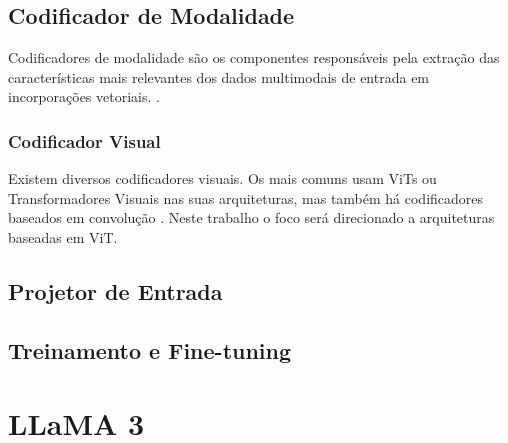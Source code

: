 \subsection{Codificador de Modalidade}

Codificadores de modalidade são os componentes responsáveis pela extração das características mais relevantes dos dados multimodais de entrada em incorporações vetoriais.
\cite{mllm_survey_2024}.

\subsubsection{Codificador Visual}

Existem diversos codificadores visuais. Os mais comuns usam \acp{ViT} ou Transformadores Visuais nas suas arquiteturas, mas também há codificadores baseados em convolução
\cite{mllm_survey_2023}. Neste trabalho o foco será direcionado a arquiteturas baseadas em \ac{ViT}.


\subsection{Projetor de Entrada}

\subsection{Treinamento e Fine-tuning}

\section{LLaMA 3}
